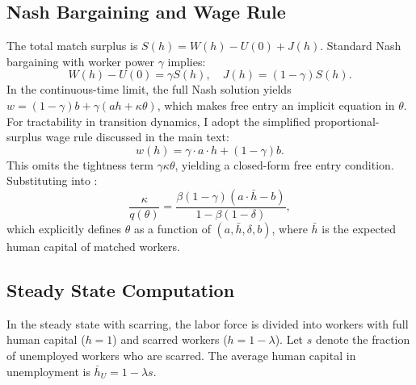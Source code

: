 \documentclass[12pt]{article}
\begin{document}
\subsection{Nash Bargaining and Wage Rule}

The total match surplus is $S(h) = W(h) - U(0) + J(h)$. Standard Nash bargaining with worker power $\gamma$ implies:
\begin{equation}
W(h) - U(0) = \gamma S(h), \quad J(h) = (1 - \gamma) S(h).
\label{eq:app_nash}
\end{equation}
In the continuous-time limit, the full Nash solution yields $w = (1-\gamma)b + \gamma(ah + \kappa\theta)$, which makes free entry an implicit equation in $\theta$. For tractability in transition dynamics, I adopt the simplified proportional-surplus wage rule discussed in the main text:
\begin{equation}
w(h) = \gamma \cdot a \cdot h + (1 - \gamma) b.
\label{eq:app_wage}
\end{equation}
This omits the tightness term $\gamma\kappa\theta$, yielding a closed-form free entry condition. Substituting into :
\begin{equation}
\frac{\kappa}{q(\theta)} = \frac{\beta(1 - \gamma)(a \cdot \bar{h} - b)}{1 - \beta(1 - \delta)},
\label{eq:app_freeentry2}
\end{equation}
which explicitly defines $\theta$ as a function of $(a, \bar{h}, \delta, b)$, where $\bar{h}$ is the expected human capital of matched workers.

\subsection{Steady State Computation}

In the steady state with scarring, the labor force is divided into workers with full human capital ($h = 1$) and scarred workers ($h = 1 - \lambda$). Let $s$ denote the fraction of unemployed workers who are scarred. The average human capital in unemployment is $\bar{h}_U = 1 - \lambda s$.
\end{document}
